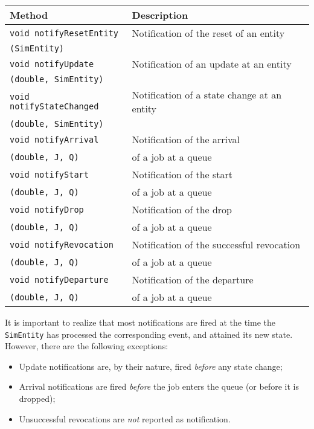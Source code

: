 \documentclass[12pt]{book}
\begin{document}
\begin{tabular}{|l|l|}
  \hline
  {\bf Method} & {\bf Description} \\
  \hline
  \lstinline[basicstyle=\footnotesize]!void notifyResetEntity!
  & Notification of the reset of an entity
  \\
  \lstinline[basicstyle=\footnotesize]!(SimEntity)!
  &
  \\
  \hline
  \lstinline[basicstyle=\footnotesize]!void notifyUpdate!
  & Notification of an update at an entity
  \\
  \lstinline[basicstyle=\footnotesize]!(double, SimEntity)!
  &
  \\
  \hline
  \lstinline[basicstyle=\footnotesize]!void notifyStateChanged!
  & Notification of a state change at an entity
  \\
  \lstinline[basicstyle=\footnotesize]!(double, SimEntity)!
  &
  \\
  \hline
  \lstinline[basicstyle=\footnotesize]!void notifyArrival!
  & Notification of the arrival
  \\
  \lstinline[basicstyle=\footnotesize]!(double, J, Q)!
  & of a job at a queue
  \\
  \hline
  \lstinline[basicstyle=\footnotesize]!void notifyStart!
  & Notification of the start
  \\
  \lstinline[basicstyle=\footnotesize]!(double, J, Q)!
  & of a job at a queue
  \\
  \hline
  \lstinline[basicstyle=\footnotesize]!void notifyDrop!
  & Notification of the drop
  \\
  \lstinline[basicstyle=\footnotesize]!(double, J, Q)!
  & of a job at a queue
  \\
  \hline
  \lstinline[basicstyle=\footnotesize]!void notifyRevocation!
  & Notification of the successful revocation
  \\
  \lstinline[basicstyle=\footnotesize]!(double, J, Q)!
  & of a job at a queue
  \\
  \hline
  \lstinline[basicstyle=\footnotesize]!void notifyDeparture!
  & Notification of the departure
  \\
  \lstinline[basicstyle=\footnotesize]!(double, J, Q)!
  & of a job at a queue
  \\
  \hline
\end{tabular}

It is important to realize that most notifications are fired
  at the time the \lstinline|SimEntity| has processed the
 corresponding event, and attained its new state.
However, there are the following exceptions:
\begin{itemize}
\item Update notifications are, by their nature, fired {\em before\/} any state change;
\item Arrival notifications are fired {\em before\/} the job enters the queue (or before it is dropped);
\item Unsuccessful revocations are {\em not\/} reported as notification.
\end{itemize}
\end{document}
